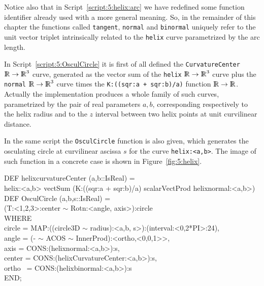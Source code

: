 \documentclass{31x47jw}
\begin{document}
Notice also that in Script~\ref{script:5:helix:arc} we have redefined
some function identifier already used with a more general meaning. 
So, in the remainder of this chapter the functions called
\texttt{tangent}, \texttt{normal} and \texttt{binormal} uniquely refer
to the unit vector triplet intrinsically related to the \texttt{helix} curve
parametrized by the arc length.

In Script~\ref{script:5:OsculCircle} it is first of all defined the
\texttt{CurvatureCenter}  $\mathbb{I\!\!R}\rightarrow\mathbb{I\!\!R}^{3}$ curve, generated as
the vector sum of the \texttt{helix} $\mathbb{I\!\!R}\rightarrow\mathbb{I\!\!R}^{3}$ curve
plus the \texttt{normal} $\mathbb{I\!\!R}\rightarrow\mathbb{I\!\!R}^{3}$ curve times the
\texttt{K:((sqr:a + sqr:b)/a)} function $\mathbb{I\!\!R}\rightarrow\mathbb{I\!\!R}$. Actually the 
implementation produces a whole family of such curves, parametrized 
by the pair of real parameters $a,b$, corresponding respectively to the helix 
radius and to the $z$ interval between two helix points at unit 
curvilinear distance.

In the same script the \texttt{OsculCircle} function is also given, which 
generates the osculating circle at curvilinear ascissa $s$ for the 
curve \texttt{helix:<a,b>}. The image of such function in a concrete 
case is shown in Figure~\ref{fig:5:helix}.

\begin{script}
\begin{smallplasm}
DEF helixcurvatureCenter (a,b::IsReal) = \+\\
  helix:<a,b> vectSum (K:((sqr:a + sqr:b)/a) scalarVectProd helixnormal:<a,b>) 
\-\\[0.3cm]

DEF OsculCircle (a,b,s::IsReal) = \+\\
  (T:<1,2,3>:center $\sim$ Rotn:<angle, axis>):circle\-\\
WHERE\+\\
  circle = MAP:((circle3D $\sim$ radius):<a,b, s>):(interval:<0,2*PI>:24),\\
  angle  = (- $\sim$ ACOS $\sim$ InnerProd):<ortho,<0,0,1>>,\\
  axis   = CONS:(helixnormal:<a,b>):s,\\
  center = CONS:(helixCurvatureCenter:<a,b>):s,\\
  ortho ~= CONS:(helixbinormal:<a,b>):s\-\\
END;
\end{smallplasm}
\label{script:5:OsculCircle}
\end{script}
\end{document}
